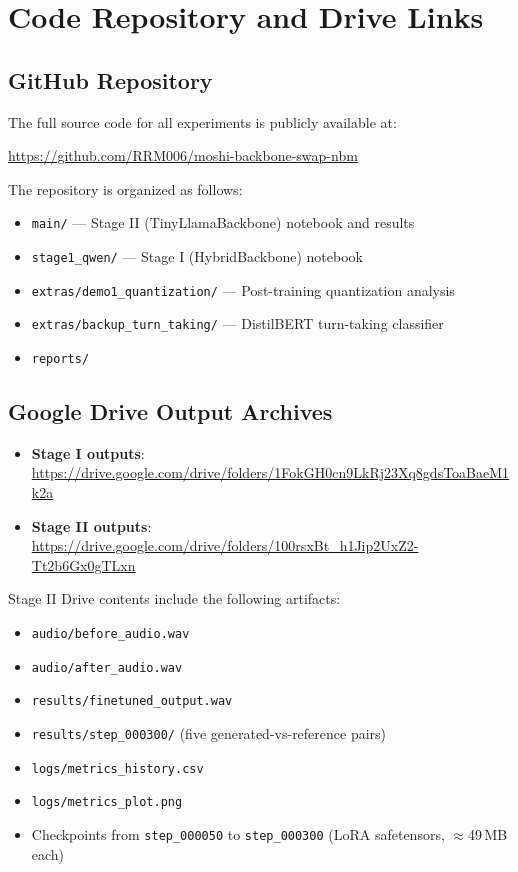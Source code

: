 \documentclass[conference]{IEEEtran}
\begin{document}
\appendix
\section{Code Repository and Drive Links}
\label{app:links}
\subsection{GitHub Repository}
The full source code for all experiments is publicly available at:
\begin{center}
\url{https://github.com/RRM006/moshi-backbone-swap-nbm}
\end{center}
The repository is organized as follows:
\begin{itemize}
  \item \texttt{main/} --- Stage II (TinyLlamaBackbone) notebook and results
  \item \texttt{stage1\_qwen/} --- Stage I (HybridBackbone) notebook
  \item \texttt{extras/demo1\_quantization/} --- Post-training quantization analysis
  \item \texttt{extras/backup\_turn\_taking/} --- DistilBERT turn-taking classifier
  \item \texttt{reports/}
\end{itemize}
\subsection{Google Drive Output Archives}
\begin{itemize}
  \item \textbf{Stage I outputs}: \url{https://drive.google.com/drive/folders/1FokGH0cn9LkRj23Xq8gdsToaBaeM1k2a}
  \item \textbf{Stage II outputs}: \url{https://drive.google.com/drive/folders/100rsxBt_h1Jip2UxZ2-Tt2b6Gx0gTLxn}
\end{itemize}
Stage II Drive contents include the following artifacts:
\begin{itemize}
    \item \texttt{audio/before\_audio.wav}
    \item \texttt{audio/after\_audio.wav}
    \item \texttt{results/finetuned\_output.wav}
    \item \texttt{results/step\_000300/} 
          (five generated-vs-reference pairs)
    \item \texttt{logs/metrics\_history.csv}
    \item \texttt{logs/metrics\_plot.png}
    \item Checkpoints from 
          \texttt{step\_000050} to 
          \texttt{step\_000300} 
          (LoRA safetensors, $\approx$49\,MB each)
\end{itemize}
\end{document}
